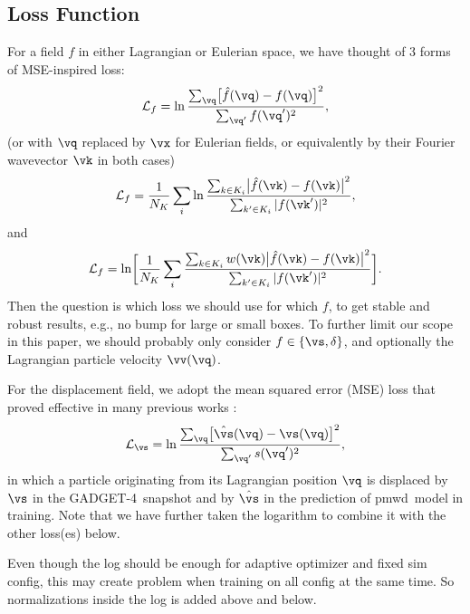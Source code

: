 \documentclass[usenatbib]{mnras}
\newcommand{\pmwd}{{\usefont{T1}{nova}{m}{sl}pmwd}}
\newcommand{\GADGET}{{{\fontsize{7.7pt}{9pt}\selectfont GADGET}-4}}
\newcommand{\cL}{\mathcal{L}}
\newcommand{\YL}[1]{\textcolor{Bittersweet}{#1}}
\begin{document}
\subsection{Loss Function}

\YL{
For a field $f$ in either Lagrangian or Eulerian space, we have thought
of 3 forms of MSE-inspired loss:
%
\begin{equation}
\cL_f = \ln \frac{\sum_\vq \bigl[ \hat f(\vq) - f(\vq) \bigr]^2}
                   {\sum_{\vq'} f(\vq')^2},
\end{equation}
%
(or with $\vq$ replaced by $\vx$ for Eulerian fields, or equivalently by
their Fourier wavevector $\vk$ in both cases)
%
\begin{equation}
\cL_f = \frac1{N_K} \sum_i \ln
\frac{\sum_{k \in K_i} \bigl| \hat f(\vk) - f(\vk) \bigr|^2}
     {\sum_{k' \in K_i} | f(\vk')|^2},
\end{equation}
%
and
%
\begin{equation}
\cL_f = \ln \biggl[ \frac1{N_K} \sum_i
\frac{\sum_{k \in K_i} w(\vk)
      \bigl| \hat f(\vk) - f(\vk) \bigr|^2}
     {\sum_{k' \in K_i} |f(\vk')|^2} \biggl].
\end{equation}
%
Then the question is which loss we should use for which $f$, to get
stable and robust results, e.g., no bump for large or small boxes.
To further limit our scope in this paper, we should probably only
consider $f \in \{\vs, \delta\}$, and optionally the Lagrangian particle
velocity $\vv(\vq)$.
}

For the displacement field, we adopt the mean squared error (MSE) loss
that proved effective in many previous works
\citep[e.g.,][]{HeEtAl2019, LiEtAl2021}:
%
\begin{equation}
\cL_\vs = \ln \frac{\sum_\vq \bigl[ \hat\vs(\vq) - \vs(\vq) \bigr]^2}
                   {\sum_{\vq'} s(\vq')^2},
\end{equation}
%
in which a particle originating from its Lagrangian position $\vq$ is
displaced by $\vs$ in the \GADGET\ snapshot and by $\hat\vs$ in the
prediction of \pmwd\ model in training.
Note that we have further taken the logarithm to combine it with the
other loss(es) below.

\YL{Even though the log should be enough for adaptive optimizer and
fixed sim config, this may create problem when training on all config at
the same time. So normalizations inside the log is added above and
below.}
\end{document}
